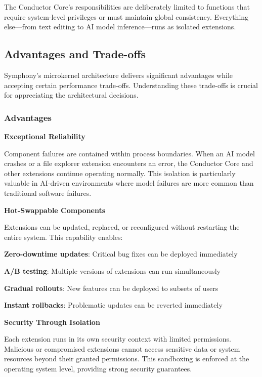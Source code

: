 The Conductor Core's responsibilities are deliberately limited to functions that require system-level privileges or must maintain global consistency. Everything else—from text editing to AI model inference—runs as isolated extensions.

\subsection{Advantages and Trade-offs}
\label{subsec:advantages-tradeoffs}

Symphony's microkernel architecture delivers significant advantages while accepting certain performance trade-offs. Understanding these trade-offs is crucial for appreciating the architectural decisions.

\subsubsection{Advantages}

\textbf{Exceptional Reliability}

Component failures are contained within process boundaries. When an AI model crashes or a file explorer extension encounters an error, the Conductor Core and other extensions continue operating normally. This isolation is particularly valuable in AI-driven environments where model failures are more common than traditional software failures.

\textbf{Hot-Swappable Components}

Extensions can be updated, replaced, or reconfigured without restarting the entire system. This capability enables:

\begin{expandedlist}
    \item \textbf{Zero-downtime updates}: Critical bug fixes can be deployed immediately
    \item \textbf{A/B testing}: Multiple versions of extensions can run simultaneously
    \item \textbf{Gradual rollouts}: New features can be deployed to subsets of users
    \item \textbf{Instant rollbacks}: Problematic updates can be reverted immediately
\end{expandedlist}

\textbf{Security Through Isolation}

Each extension runs in its own security context with limited permissions. Malicious or compromised extensions cannot access sensitive data or system resources beyond their granted permissions. This sandboxing is enforced at the operating system level, providing strong security guarantees.

